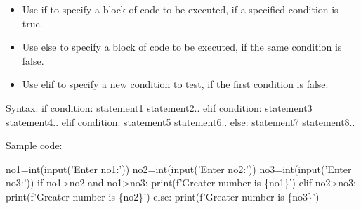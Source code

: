 \setlength{\columnsep}{3pt}
\begin{flushleft}
	
	\begin{itemize}
		\item Use if to specify a block of code to be executed, if a specified condition is true.
		\item Use else to specify a block of code to be executed, if the same condition is false.
		\item Use elif to specify a new condition to test, if the first condition is false.
	\end{itemize}
	
	
	\begin{tcolorbox}[breakable,notitle,boxrule=1pt,colback=pink,colframe=pink]
		\color{black}
		\font=8pt
		Syntax: 
		\newline
		if condition:
 \newline
		\hphantom{} \hphantom{}  statement1 \newline
		\hphantom{} \hphantom{}  statement2.. \newline
		elif condition: \newline
		\hphantom{} \hphantom{}  statement3 \newline
		\hphantom{} \hphantom{}  statement4.. \newline
		elif condition: \newline
		\hphantom{} \hphantom{}  statement5 \newline
		\hphantom{} \hphantom{}  statement6.. \newline
		else: \newline
		\hphantom{} \hphantom{}  statement7 \newline
		\hphantom{} \hphantom{}  statement8..
		\font=4pt
	\end{tcolorbox}
	
	Sample code:
	\begin{tcolorbox}[breakable,notitle,boxrule=-0pt,colback=code,colframe=code]
		\color{white}
		\font=8pt
		no1=int(input('Enter no1:')) \newline
		no2=int(input('Enter no2:')) \newline
		no3=int(input('Enter no3:')) \newline
		\newline
		if no1>no2 and no1>no3: \newline
		\hphantom{} \hphantom{} print(f'Greater number is \{no1\}') \newline
		elif no2>no3: \newline
		\hphantom{} \hphantom{} print(f'Greater number is \{no2\}') \newline
		else: \newline
		\hphantom{} \hphantom{} print(f'Greater number is \{no3\}') 
		\font=4pt
	\end{tcolorbox}
	

\end{flushleft}
